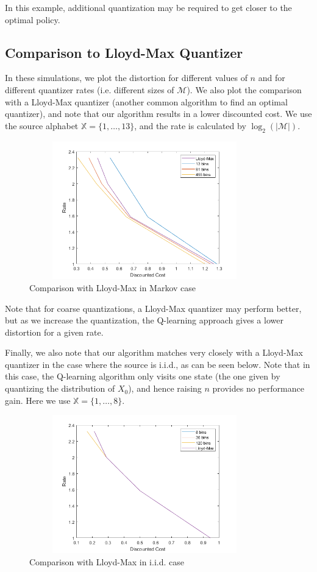 \documentclass{article}
\begin{document}
In this example, additional quantization may be required to get closer to the optimal policy.

\subsection{Comparison to Lloyd-Max Quantizer}
In these simulations, we plot the distortion for different values of \( n \) and for different quantizer rates (i.e. different sizes of \(\mathcal{M}\)). We also plot the comparison with a Lloyd-Max quantizer (another common algorithm to find an optimal quantizer), and note that our algorithm results in a lower discounted cost. We use the source alphabet \( \mathbb{X} = \{1,\ldots,13\} \), and the rate is calculated by \(\log_2(|\mathcal{M}|)\).

\begin{figure}[H]
    \centering
    \includegraphics[height=6cm, width=10cm]{rate_distortion_lloydmax.png}
    \caption{Comparison with Lloyd-Max in Markov case}
\end{figure}

Note that for coarse quantizations, a Lloyd-Max quantizer may perform better, but as we increase the quantization, the Q-learning approach gives a lower distortion for a given rate.

Finally, we also note that our algorithm matches very closely with a Lloyd-Max quantizer in the case where the source is i.i.d., as can be seen below. Note that in this case, the Q-learning algorithm only visits one state (the one given by quantizing the distribution of \(X_0\)), and hence raising \(n\) provides no performance gain. Here we use \( \mathbb{X} = \{1,\ldots,8\} \).

\begin{figure}[H]
    \centering
    \includegraphics[height=6cm, width=10cm]{lloydmax_scalar.png}
    \caption{Comparison with Lloyd-Max in i.i.d. case}
\end{figure}
\end{document}
